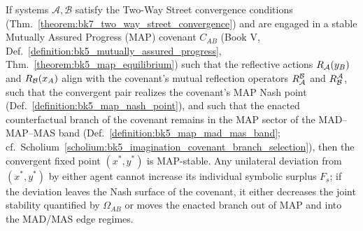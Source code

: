 \begin{propositio}
\label{proposition:bk7_map_compatible_reciprocity}
If systems \(\mathcal{A},\mathcal{B}\) satisfy the Two-Way Street convergence conditions (Thm.~\ref{theorem:bk7_two_way_street_convergence}) and are engaged in a stable Mutually Assured Progress (MAP) covenant \(C_{AB}\) (Book V, Def.~\ref{definition:bk5_mutually_assured_progress}, Thm.~\ref{theorem:bk5_map_equilibrium}) such that the reflective actions \(R_{\mathcal{A}}(y_B)\) and \(R_{\mathcal{B}}(x_A)\) align with the covenant's mutual reflection operators \(R^{\mathcal{B}}_{\mathcal{A}}\) and \(R^{\mathcal{A}}_{\mathcal{B}}\), such that the convergent pair realizes the covenant's MAP Nash point (Def.~\ref{definition:bk5_map_nash_point}), and such that the enacted counterfactual branch of the covenant remains in the MAP sector of the MAD--MAP--MAS band (Def.~\ref{definition:bk5_map_mad_mas_band}; cf.~Scholium~\ref{scholium:bk5_imagination_covenant_branch_selection}), then the convergent fixed point \((x^{\ast}, y^{\ast})\) is MAP-stable. Any unilateral deviation from \((x^{\ast}, y^{\ast})\) by either agent cannot increase its individual symbolic surplus \(F_s\); if the deviation leaves the Nash surface of the covenant, it either decreases the joint stability quantified by \(\Omega_{AB}\) or moves the enacted branch out of MAP and into the MAD/MAS edge regimes.
\end{propositio}
